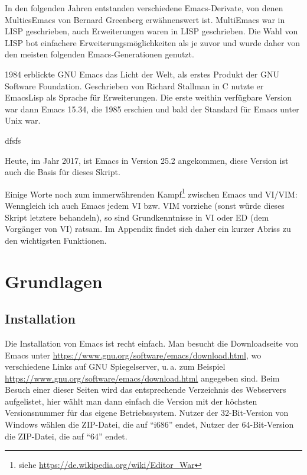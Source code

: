 \documentclass[12pt,ngerman]{scrbook}
\begin{document}
In den folgenden Jahren entstanden verschiedene Emacs-Derivate, von denen MulticsEmacs von Bernard Greenberg erwähnenswert ist.
MultiEmacs war in LISP geschrieben, auch Erweiterungen waren in LISP geschrieben. Die Wahl von LISP bot einfachere Erweiterungsmöglichkeiten als je zuvor und wurde daher von den meisten folgenden Emacs-Generationen genutzt. 

1984 erblickte GNU Emacs das Licht der Welt, als erstes Produkt der GNU Software Foundation. 
Geschrieben von Richard Stallman in C nutzte er EmacsLisp als Sprache für Erweiterungen.
Die erste weithin verfügbare Version war dann Emacs 15.34, die 1985 erschien und bald der Standard für Emacs unter Unix war.

\begin{tcolorbox}[title={Wissen: Richard Stallman und die GNU Foundation},arc=0pt]
dfsfs

\end{tcolorbox}


Heute, im Jahr 2017, ist Emacs in Version 25.2 angekommen, diese Version ist auch die Basis für dieses Skript.

Einige Worte noch zum immerwährenden Kampf\footnote{siehe \url{https://de.wikipedia.org/wiki/Editor_War}} zwischen Emacs und VI/VIM: Wenngleich ich auch Emacs jedem VI bzw. VIM vorziehe (sonst würde dieses Skript letztere behandeln), so sind Grundkenntnisse in VI oder ED (dem Vorgänger von VI) ratsam. 
Im Appendix findet sich daher ein kurzer Abriss zu den wichtigsten Funktionen.

\chapter{Grundlagen}

\section{Installation}

Die Installation von Emacs ist recht einfach. 
Man besucht die Downloadseite von Emacs unter \url{https://www.gnu.org/software/emacs/download.html}, wo verschiedene Links auf GNU Spiegelserver, u.\,a. zum Beispiel \url{https://www.gnu.org/software/emacs/download.html} angegeben sind. 
Beim Besuch einer dieser Seiten wird das entsprechende Verzeichnis des Webservers aufgelistet, hier wählt man dann einfach die Version mit der höchsten Versionsnummer für das eigene Betriebssystem. 
Nutzer der 32-Bit-Version von Windows wählen die ZIP-Datei, die auf \enquote{i686} endet, Nutzer der 64-Bit-Version die ZIP-Datei, die auf \enquote{64} endet.
\end{document}

